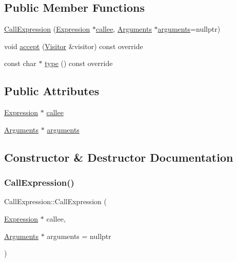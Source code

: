 \subsection*{Public Member Functions}
\begin{DoxyCompactItemize}
\item 
\hyperlink{struct_call_expression_a7e6da0437a5f82430af5f31779b830d7}{Call\+Expression} (\hyperlink{struct_expression}{Expression} $\ast$\hyperlink{struct_call_expression_a2d77ccd1a2d6f34d718063f0eb47bc21}{callee}, \hyperlink{struct_arguments}{Arguments} $\ast$\hyperlink{struct_call_expression_ad2dad57df529ef1ef06b43cd438598bd}{arguments}=nullptr)
\item 
void \hyperlink{struct_call_expression_a5be626b61944a97f2a6015b632432513}{accept} (\hyperlink{struct_visitor}{Visitor} \&visitor) const override
\item 
const char $\ast$ \hyperlink{struct_call_expression_ae2891106618133745e00ac92a6b6b4fd}{type} () const override
\end{DoxyCompactItemize}
\subsection*{Public Attributes}
\begin{DoxyCompactItemize}
\item 
\hyperlink{struct_expression}{Expression} $\ast$ \hyperlink{struct_call_expression_a2d77ccd1a2d6f34d718063f0eb47bc21}{callee}
\item 
\hyperlink{struct_arguments}{Arguments} $\ast$ \hyperlink{struct_call_expression_ad2dad57df529ef1ef06b43cd438598bd}{arguments}
\end{DoxyCompactItemize}


\subsection{Constructor \& Destructor Documentation}
\mbox{\label{struct_call_expression_a7e6da0437a5f82430af5f31779b830d7}} 
\subsubsection{\texorpdfstring{Call\+Expression()}{CallExpression()}}
{\footnotesize\ttfamily Call\+Expression\+::\+Call\+Expression (\begin{DoxyParamCaption}\item[{\hyperlink{struct_expression}{Expression} $\ast$}]{callee,  }\item[{\hyperlink{struct_arguments}{Arguments} $\ast$}]{arguments = {\ttfamily nullptr} }\end{DoxyParamCaption})\hspace{0.3cm}{\ttfamily [inline]}}



